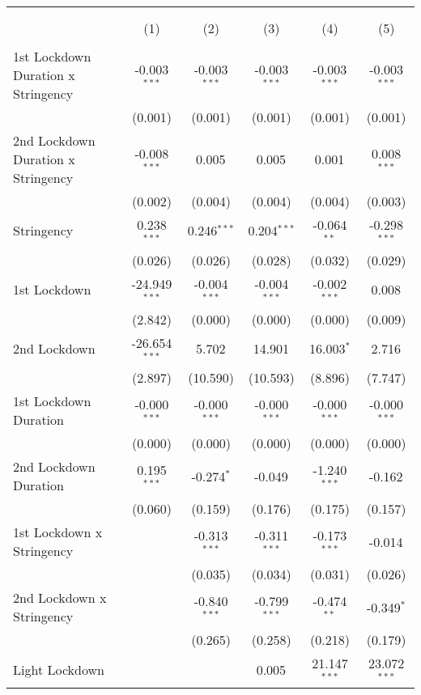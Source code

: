\begin{tabular}{@{\extracolsep{5pt}}lccccc}
\\[-1.8ex]\hline
\hline \\[-1.8ex]
& \multicolumn{5}{c}{\textit{}} \
\cr \cline{5-6}
\\[-1.8ex] & (1) & (2) & (3) & (4) & (5) \\
\hline \\[-1.8ex]
 1st Lockdown Duration x Stringency & -0.003$^{***}$ & -0.003$^{***}$ & -0.003$^{***}$ & -0.003$^{***}$ & -0.003$^{***}$ \\
  & (0.001) & (0.001) & (0.001) & (0.001) & (0.001) \\
 2nd Lockdown Duration x Stringency & -0.008$^{***}$ & 0.005$^{}$ & 0.005$^{}$ & 0.001$^{}$ & 0.008$^{***}$ \\
  & (0.002) & (0.004) & (0.004) & (0.004) & (0.003) \\
 Stringency & 0.238$^{***}$ & 0.246$^{***}$ & 0.204$^{***}$ & -0.064$^{**}$ & -0.298$^{***}$ \\
  & (0.026) & (0.026) & (0.028) & (0.032) & (0.029) \\
 1st Lockdown & -24.949$^{***}$ & -0.004$^{***}$ & -0.004$^{***}$ & -0.002$^{***}$ & 0.008$^{}$ \\
  & (2.842) & (0.000) & (0.000) & (0.000) & (0.009) \\
 2nd Lockdown & -26.654$^{***}$ & 5.702$^{}$ & 14.901$^{}$ & 16.003$^{*}$ & 2.716$^{}$ \\
  & (2.897) & (10.590) & (10.593) & (8.896) & (7.747) \\
 1st Lockdown Duration & -0.000$^{***}$ & -0.000$^{***}$ & -0.000$^{***}$ & -0.000$^{***}$ & -0.000$^{***}$ \\
  & (0.000) & (0.000) & (0.000) & (0.000) & (0.000) \\
 2nd Lockdown Duration & 0.195$^{***}$ & -0.274$^{*}$ & -0.049$^{}$ & -1.240$^{***}$ & -0.162$^{}$ \\
  & (0.060) & (0.159) & (0.176) & (0.175) & (0.157) \\
 1st Lockdown x Stringency & & -0.313$^{***}$ & -0.311$^{***}$ & -0.173$^{***}$ & -0.014$^{}$ \\
  & & (0.035) & (0.034) & (0.031) & (0.026) \\
 2nd Lockdown x Stringency & & -0.840$^{***}$ & -0.799$^{***}$ & -0.474$^{**}$ & -0.349$^{*}$ \\
  & & (0.265) & (0.258) & (0.218) & (0.179) \\
 Light Lockdown & & & 0.005$^{}$ & 21.147$^{***}$ & 23.072$^{***}$ \\

\end{tabular}
